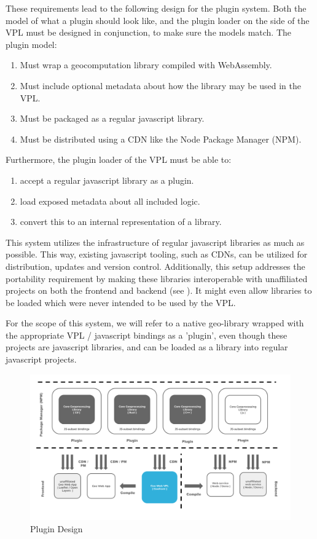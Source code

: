 These requirements lead to the following design for the plugin system.
Both the model of what a plugin should look like, and the plugin loader on the side of the VPL must be designed in conjunction, to make sure the models match.  
The plugin model:
\begin{enumerate}[-]
  \item Must wrap a geocomputation library compiled with WebAssembly.
  \item Must include optional metadata about how the library may be used in the VPL.
  \item Must be packaged as a regular javascript library.
  \item Must be distributed using a \ac{CDN} like the Node Package Manager (NPM).
\end{enumerate}

Furthermore, the plugin loader of the VPL must be able to: 
\begin{enumerate}[-]
  \item accept a regular javascript library as a plugin. 
  \item load exposed metadata about all included logic.
  \item convert this to an internal representation of a library.
\end{enumerate}

This system utilizes the infrastructure of regular javascript libraries as much as possible. 
This way, existing javascript tooling, such as \ac{CDN}s, can be utilized for distribution, updates and version control.
Additionally, this setup addresses the portability requirement by making these libraries interoperable with unaffiliated projects on both the frontend and backend (see ).
It might even allow libraries to be loaded which were never intended to be used by the VPL.

For the scope of this system, we will refer to a native geo-library wrapped with the appropriate VPL / javascript bindings as a 'plugin', even though these projects are javascript libraries, and can be loaded as a library into regular javascript projects. 

\begin{figure}
  \centering
  \graphicspath{ {../../assets/diagrams/} }
  \includegraphics[width=\linewidth]{Model Proposal.png}
  \caption{Plugin Design}
  \label{fig:plugin-model}
\end{figure}

